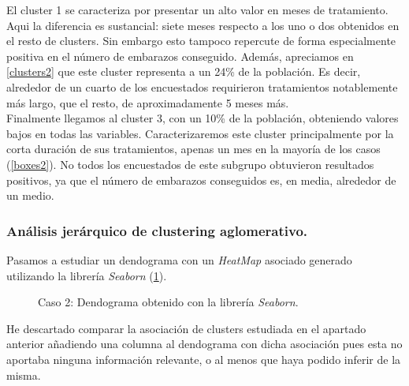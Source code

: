 \documentclass[11pt,a4paper]{article}
\begin{document}
	El cluster 1 se caracteriza por presentar un alto valor en meses de tratamiento. Aqui la diferencia es sustancial: siete meses respecto a los uno o dos obtenidos en el resto de clusters. Sin embargo esto tampoco repercute de forma especialmente positiva en el número de embarazos conseguido. Además, apreciamos en \ref{clusters2} que este cluster representa a un 24\% de la población. Es decir, alrededor de un cuarto de los encuestados requirieron tratamientos notablemente más largo, que el resto, de aproximadamente 5 meses más. \\

	Finalmente llegamos al cluster 3, con un 10\% de la población, obteniendo valores bajos en todas las variables. Caracterizaremos este cluster principalmente por la corta duración de sus tratamientos, apenas un mes en la mayoría de los casos (\ref{boxes2}). No todos los encuestados de este subgrupo obtuvieron resultados positivos, ya que el número de embarazos conseguidos es, en media, alrededor de un medio. \\
	
	\subsubsection{Análisis jerárquico de clustering aglomerativo.}
	
	Pasamos a estudiar un dendograma con un \emph{HeatMap} asociado generado utilizando la librería \emph{Seaborn} (\ref{dendograma2}). \\
	
	\begin{figure}[] 
		\caption{Caso 2: Dendograma obtenido con la librería \emph{Seaborn}.} 
		\label{dendograma2}
	\end{figure}
	
	He descartado comparar la asociación de clusters estudiada en el apartado anterior añadiendo una columna al dendograma con dicha asociación pues esta no aportaba ninguna información relevante, o al menos que haya podido inferir de la misma. \\
	
\end{document}
